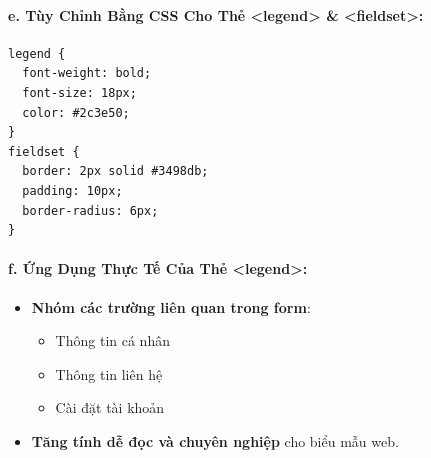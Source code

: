 \documentclass[11pt,oneside]{book}
\begin{document}
\paragraph{e. Tùy Chỉnh Bằng CSS Cho Thẻ <legend> \& <fieldset>:}
\begin{codeWindow}
\begin{lstlisting}[language=CSS3]
legend {
  font-weight: bold;
  font-size: 18px;
  color: #2c3e50;
}
fieldset {
  border: 2px solid #3498db;
  padding: 10px;
  border-radius: 6px;
}
\end{lstlisting}
\end{codeWindow}

\paragraph{f. Ứng Dụng Thực Tế Của Thẻ <legend>:}
\begin{itemize}[leftmargin=1.5em, itemsep=3pt, parsep=0pt]
    \item \textbf{Nhóm các trường liên quan trong form}:
    \begin{itemize}[leftmargin=1.2em, itemsep=2pt]
        \item Thông tin cá nhân
        \item Thông tin liên hệ
        \item Cài đặt tài khoản
    \end{itemize}
    \item \textbf{Tăng tính dễ đọc và chuyên nghiệp} cho biểu mẫu web.
\end{itemize}
\end{document}
